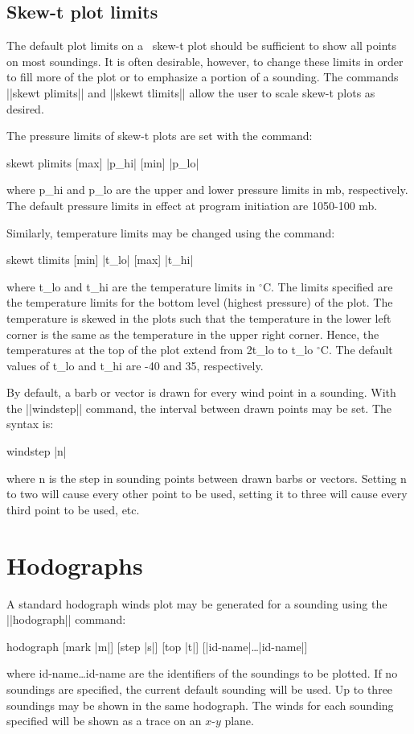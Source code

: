 \subsection{Skew-t plot limits}
The default plot limits on a \suds\ skew-t plot should be sufficient to show
all points on most soundings.  It is often desirable, however, to change these
limits in order to fill more of the plot or to emphasize a portion of a 
sounding.  The commands ||skewt plimits|| and ||skewt tlimits|| allow the 
user to scale skew-t plots as desired.

The pressure limits of skew-t plots are set with the command:
\begin{example}
	skewt plimits [max] |p\_hi| [min] |p\_lo|
\end{example}
where {\pf p\_hi} and {\pf p\_lo} are the upper and lower pressure limits
in mb, respectively.  The default pressure limits in effect at program
initiation are 1050-100 mb.

Similarly, temperature limits may be changed using the command:
\begin{example}
	skewt tlimits [min] |t\_lo| [max] |t\_hi|
\end{example}
where {\pf t\_lo} and {\pf t\_hi} are the temperature limits in $^\circ$C.
The limits specified are the temperature limits for the bottom level (highest
pressure) of the plot.  The temperature is skewed in the plots such that 
the temperature in the lower left corner is the same as the temperature in 
the upper right corner.  Hence, the temperatures at the top of the plot extend
from 2{\pf t\_lo} to {\pf t\_lo} $^\circ$C.  The default
values of {\pf t\_lo} and {\pf t\_hi} are -40 and 35, respectively.

By default, a barb or vector is drawn for every wind point in a sounding.
With the ||windstep|| command, the interval between drawn points may be set.
The syntax is:
\begin{example}
	windstep |n|
\end{example}
where {\pf n} is the step in sounding points between drawn barbs or vectors.
Setting {\pf n} to two will cause every other point to be used, setting it
to three will cause every third point to be used, etc.

\section{Hodographs}
A standard hodograph winds plot may be generated for a sounding using the 
||hodograph|| command:
\begin{example}
	hodograph [mark |m|] [step |s|] [top |t|] [|id-name|\ldots|id-name|]
\end{example}
where {\pf id-name\ldots id-name} are the identifiers of the 
soundings to be plotted.  If no soundings are specified, the current default
sounding will be used.  Up to three soundings may be shown in the same 
hodograph.  The winds for each sounding specified will be shown as a trace 
on an $x$-$y$ plane.

